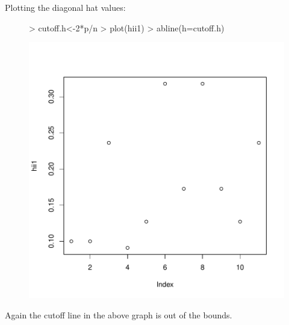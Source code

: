 \documentclass[12pt]{article}
\begin{document}
\begin{itemize}
Plotting the diagonal hat values:
\begin{figure}[H]
\begin{Schunk}
\begin{Sinput}
> cutoff.h<-2*p/n
> plot(hii1)
> abline(h=cutoff.h)
\end{Sinput}
\end{Schunk}
\includegraphics{HW6-008}
\end{figure}
Again the cutoff line in the above graph is out of the bounds.
\clearpage


\end{itemize}
\end{document}
